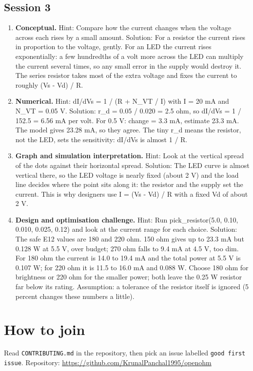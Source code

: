 \documentclass[11pt,a4paper]{article}
\begin{document}
\subsection*{Session 3}
\begin{enumerate}[nosep]
\item \textbf{Conceptual.} Hint: Compare how the current changes when the voltage across each rises by a small amount. Solution: For a resistor the current rises in proportion to the voltage, gently. For an LED the current rises exponentially: a few hundredths of a volt more across the LED can multiply the current several times, so any small error in the supply would destroy it. The series resistor takes most of the extra voltage and fixes the current to roughly (Vs - Vd) / R.
\item \textbf{Numerical.} Hint: dI/dVs = 1 / (R + N\_VT / I) with I = 20 mA and N\_VT = 0.05 V. Solution: r\_d = 0.05 / 0.020 = 2.5 ohm, so dI/dVs = 1 / 152.5 = 6.56 mA per volt. For 0.5 V: change = 3.3 mA, estimate 23.3 mA. The model gives 23.28 mA, so they agree. The tiny r\_d means the resistor, not the LED, sets the sensitivity: dI/dVs is almost 1 / R.
\item \textbf{Graph and simulation interpretation.} Hint: Look at the vertical spread of the dots against their horizontal spread. Solution: The LED curve is almost vertical there, so the LED voltage is nearly fixed (about 2 V) and the load line decides where the point sits along it: the resistor and the supply set the current. This is why designers use I = (Vs - Vd) / R with a fixed Vd of about 2 V.
\item \textbf{Design and optimisation challenge.} Hint: Run pick\_resistor(5.0, 0.10, 0.010, 0.025, 0.12) and look at the current range for each choice. Solution: The safe E12 values are 180 and 220 ohm. 150 ohm gives up to 23.3 mA but 0.128 W at 5.5 V, over budget; 270 ohm falls to 9.4 mA at 4.5 V, too dim. For 180 ohm the current is 14.0 to 19.4 mA and the total power at 5.5 V is 0.107 W; for 220 ohm it is 11.5 to 16.0 mA and 0.088 W. Choose 180 ohm for brightness or 220 ohm for the smaller power; both leave the 0.25 W resistor far below its rating. Assumption: a tolerance of the resistor itself is ignored (5 percent changes these numbers a little).
\end{enumerate}

\section{How to join}
Read \texttt{CONTRIBUTING.md} in the repository, then pick an issue labelled \texttt{good first issue}. Repository: \url{https://github.com/KrunalPanchal1995/openohm}
\end{document}
